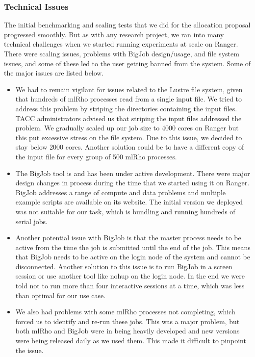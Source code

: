 \documentclass{sig-alternate}
\begin{document}
\subsubsection{Technical Issues }

The initial benchmarking and scaling tests that we did for the allocation proposal progressed smoothly. But as with any research project, we ran into many technical challenges when we started running experiments at scale on Ranger. There were scaling issues, problems with BigJob design/usage, and file system issues, and some of these led to the user getting banned from the system. Some of the major issues are listed below. 
\begin{itemize}
\item We had to remain vigilant for issues related to the Lustre file system, given that hundreds of mlRho
  processes read from a single input file. We tried to address this problem by striping the directories
  containing the input files. TACC administrators advised us that striping the input files addressed the
  problem. We gradually scaled up our job size to 4000 cores on Ranger but this put excessive stress on the
  file system. Due to this issue, we decided to stay below 2000 cores. Another solution could be to have a
  different copy of the input file for every group of 500 mlRho processes.
\item The BigJob tool is and has been under active development. There were major design changes in process
  during the time that we started using it on Ranger. BigJob addresses a range of compute and data problems
  and multiple example scripts are available on its website. The initial version we deployed was not suitable for
  our task, which is bundling and running hundreds of serial jobs.
\item Another potential issue with BigJob is that the master process needs to be active from the time the job
  is submitted until the end of the job. This means that BigJob needs to be active on the login node of the
  system and cannot be disconnected. Another solution to this issue is to run BigJob in a screen session or use another
  tool like nohup on the login node. In the end we were told not to run more than four interactive sessions at a time, which was less than
  optimal for our use case.
\item We also had problems with some mlRho processes not completing, which forced us to identify and re-run
  these jobs. This was a major problem, but both mlRho and BigJob were in being heavily developed and new
  versions were being released daily as we used them. This made it difficult to pinpoint the issue.

\end{itemize}
\end{document}
